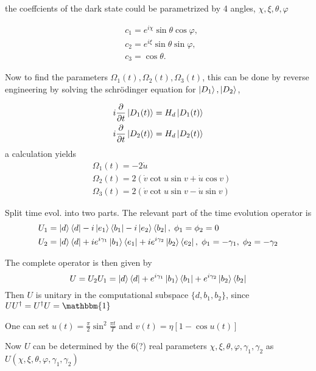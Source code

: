 the coeffcients of the dark state could be parametrized by 4 angles, $\chi, \xi, \theta, \varphi$ 

\begin{equation}
\begin{aligned}&
c_1 = e^{i\chi}\sin \theta \cos \varphi, 
\\&
c_2 = e^{i\xi} \sin \theta \sin \varphi,
\\&
c_3 = \cos \theta.
\end{aligned}
\end{equation}

Now to find the parameters $\Omega_1(t), \Omega_2(t), \Omega_3(t)$, this can be done by reverse engineering by solving the schrödinger equation for $\ket{D_1}, \ket{D_2}$, 

\begin{equation}
\begin{aligned}&
i\pdv{}{t}\ket{D_1(t)} = H_d\ket{D_1(t)}
\\&
i\pdv{}{t}\ket{D_2(t)} = H_d\ket{D_2(t)}
\end{aligned}
\end{equation}
a calculation yields
\begin{equation}
\begin{aligned}&
\Omega_1(t) = -2\dot{u}
\\ &
\Omega_2(t) = 2\left(\dot{v}\cot u\sin v + \dot{u}\cos v \right)
\\ &
\Omega_3(t) = 2\left(\dot{v}\cot u\sin v - \dot{u}\sin v \right)
\end{aligned}
\end{equation}

Split time evol. into two parts.
The relevant part of the time evolution operator is
\begin{equation}
\begin{aligned}&
U_1 = \ket{d}\bra{d} -i\ket{e_1}\bra{b_1} -i\ket{e_2}\bra{b_2},\; \phi_1 = \phi_2 = 0
\\&
U_2 = \ket{d}\bra{d} +ie^{i\gamma_1}\ket{b_1}\bra{e_1} +ie^{i\gamma_2}\ket{b_2}\bra{e_2},\; \phi_1 = -\gamma_1,\; \phi_2 = -\gamma_2
\end{aligned}
\end{equation}

The complete operator is then given by 
\begin{equation}
U = U_2U_1 = \ket{d}\bra{d} + e^{i\gamma_1}\ket{b_1}\bra{b_1} + e^{i\gamma_2}\ket{b_2}\bra{b_2}
\end{equation}
Then $U$ is unitary in the computational subspace $\{d,b_1,b_2\}$, since $UU^{\dagger} = U^{\dagger}U = \mathbbm{1}$ 


One can set $u(t) = \frac{\pi}{2}\sin^2\frac{\pi t}{T}$ and $v(t) = \eta\left[1 - \cos u(t)\right]$

Now $U$ can be determined by the 6(?) real parameters $\chi, \xi, \theta, \varphi, \gamma_1, \gamma_2$ as $U(\chi, \xi, \theta, \varphi, \gamma_1, \gamma_2)$ 





